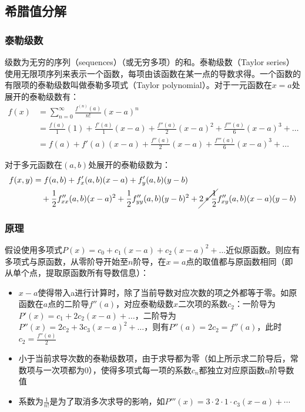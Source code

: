 \documentclass[11pt]{article}
\begin{document}
\subsection{希腊值分解}

\subsubsection{泰勒级数}

级数为无穷的序列（sequences）（或无穷多项）的和。泰勒级数（Taylor series）使用无限项序列来表示一个函数，每项由该函数在某一点的导数求得。一个函数的有限项的泰勒级数叫做泰勒多项式（Taylor polynomial）。对于一元函数在$x=a$处展开的泰勒级数有：
\begin{align*}
    f(x) &= \sum^{\infty}_{n=0} \frac{f^{(n)}(a)}{n!}(x-a)^n \\
    &= \frac{f(a)}{1}(1)+ \frac{f'(a)}{1}(x-a) + \frac{f''(a)}{2}(x-a)^2 + \frac{f'''(a)}{6}(x-a)^3 + \dots \\
    &= f(a) + f'(a)(x-a) + \frac{f''(a)}{2}(x-a) + \frac{f'''(a)}{6}(x-a)^3 + \dots
\end{align*}

对于多元函数在$(a,b)$处展开的泰勒级数为：
\begin{align*}
    f(x,y) &= f(a,b) + f'_x(a,b)(x-a) + f'_y(a,b)(y-b) \\
    &\quad + \frac{1}{2}f''_{xx}(a,b)(x-a)^2 + \frac{1}{2}f''_{yy}(a,b)(y-b)^2 +\cancel{2*\frac{1}{2}}f''_{xy}(a,b)(x-a)(y-b)
\end{align*}

\subsubsection*{原理}
假设使用多项式$P(x) = c_0 + c_1 (x-a) + c_2 (x-a)^2 + \dots$近似原函数。则应有多项式与原函数，从零阶导开始至$n$阶导，在$x=a$点的取值都与原函数相同（即从单个点，提取原函数所有导数信息）：
\begin{itemize}
    \item $x-a$使得带入a进行计算时，除了当前导数对应次数的项之外都等于零。如原函数在$a$点的二阶导$f''(a)$，对应泰勒级数$x$二次项的系数$c_2$：一阶导为$P'(x) = c_1 + 2c_2(x-a)+\dots$，二阶导为$P''(x) = 2c_2 + 3c_3(x-a)^2 + \dots$，则有$P''(a) = 2c_2 = f''(a)$，此时$c_2 = \tfrac{f''(a)}{2}$
    \item 小于当前求导次数的泰勒级数项，由于求导都为零（如上所示求二阶导后，常数项与一次项都为0），使得多项式每一项的系数$c_n$都独立对应原函数n阶导数值
    \item 系数为$\frac{1}{n!}$是为了取消多次求导的影响，如$P'''(x)=3 \cdot 2 \cdot 1 \cdot c_3(x-a) + \cdots$
\end{itemize}
\end{document}

